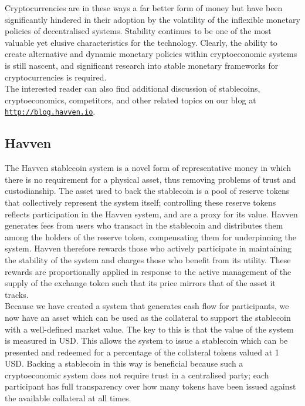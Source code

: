 \noindent Cryptocurrencies are in these ways a far better form of money but have been significantly hindered
in their adoption by the volatility of the inflexible monetary policies of decentralised systems.
Stability continues to be one of the most valuable yet elusive
characteristics for the technology. Clearly, the ability to create alternative and dynamic monetary policies within
cryptoeconomic systems is still nascent, and significant research into stable monetary
frameworks for cryptocurrencies is required. \\

\noindent The interested reader can also find additional discussion of stablecoins,
cryptoeconomics, competitors, and other related topics on our blog at \href{http://blog.havven.io}{\texttt{http://blog.havven.io}}.



\subsection{Havven}

\noindent The Havven stablecoin system is a novel form of representative money in which there is no requirement for a physical
asset, thus removing problems of trust and custodianship. The asset used to back the stablecoin is 
a pool of reserve tokens that collectively represent the system itself; controlling these reserve tokens reflects participation in the Havven system,
and are a proxy for its value. Havven generates fees from users who transact in the stablecoin and distributes them among the holders of the reserve token, compensating them for underpinning the system.
Havven therefore rewards those who actively participate in maintaining the stability of the system and charges those who benefit from its utility. These rewards are proportionally applied in response to the active management of the supply of the exchange token such that its price mirrors that of the asset it tracks. \\

\noindent Because we have created a system that generates cash flow for participants,
we now have an asset which can be used as the collateral to support the stablecoin with
a well-defined market value. The key to this is that the value of the system is measured in USD.
This allows the system to issue a stablecoin which can be presented and redeemed for a
percentage of the collateral tokens valued at 1 USD. Backing a stablecoin in this way is
beneficial because such a cryptoeconomic system does not require trust in a centralised party;
each participant has full transparency over how many tokens have been issued against the
available collateral at all times. \\

